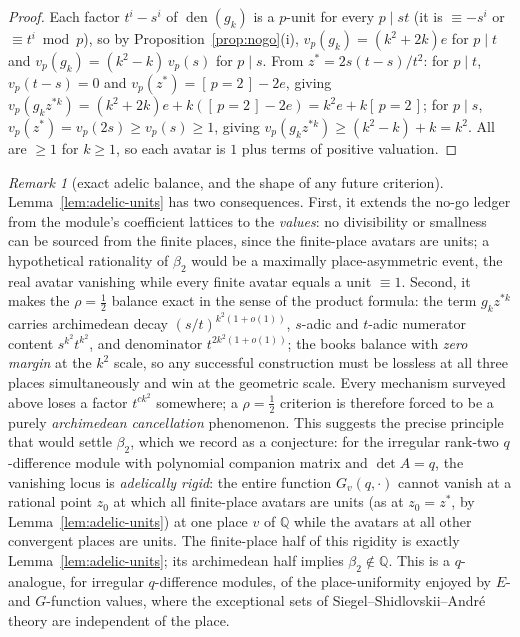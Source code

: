 \documentclass[11pt]{article}
\theoremstyle{plain}
\theoremstyle{definition}
\theoremstyle{remark}
\newtheorem{remark}[theorem]{Remark}
\newcommand{\Q}{\mathbb{Q}}
\begin{document}
\begin{proof}
Each factor $t^i-s^i$ of $\operatorname{den}(g_k)$ is a $p$-unit for every $p\mid st$ (it is
$\equiv-s^i$ or $\equiv t^i\bmod p$), so by Proposition~\ref{prop:nogo}\textup{(i)},
$v_p(g_k)=(k^2+2k)e$ for $p\mid t$ and $v_p(g_k)=(k^2-k)\,v_p(s)$ for $p\mid s$. From
$z^\ast=2s(t-s)/t^2$: for $p\mid t$, $v_p(t-s)=0$ and $v_p(z^\ast)=[\,p=2\,]-2e$, giving
$v_p(g_kz^{\ast k})=(k^2+2k)e+k([\,p=2\,]-2e)=k^2e+k[\,p=2\,]$; for $p\mid s$,
$v_p(z^\ast)=v_p(2s)\ge v_p(s)\ge1$, giving $v_p(g_kz^{\ast k})\ge(k^2-k)+k=k^2$. All are $\ge1$ for
$k\ge1$, so each avatar is $1$ plus terms of positive valuation.
\end{proof}

\begin{remark}[exact adelic balance, and the shape of any future criterion]
\label{rem:adelic-balance}
Lemma~\ref{lem:adelic-units} has two consequences. First, it extends the no-go ledger from the
module's coefficient lattices to the \emph{values}: no divisibility or smallness can be sourced from
the finite places, since the finite-place avatars are units; a hypothetical rationality of
$\beta_2$ would be a maximally place-asymmetric event, the real avatar vanishing while every finite
avatar equals a unit $\equiv1$. Second, it makes the $\rho=\tfrac12$ balance exact in the sense of
the product formula: the term $g_kz^{\ast k}$ carries archimedean decay $(s/t)^{k^2(1+o(1))}$,
$s$-adic and $t$-adic numerator content $s^{k^2}t^{k^2}$, and denominator $t^{2k^2(1+o(1))}$; the
books balance with \emph{zero margin} at the $k^2$ scale, so any successful construction must be
lossless at all three places simultaneously and win at the geometric scale. Every mechanism surveyed
above loses a factor $t^{ck^2}$ somewhere; a $\rho=\tfrac12$ criterion is therefore forced to be a
purely \emph{archimedean cancellation} phenomenon. This suggests the precise principle that would
settle $\beta_2$, which we record as a conjecture: for the irregular rank-two $q$-difference module
with polynomial companion matrix and $\det A=q$, the vanishing locus is \emph{adelically rigid}: the entire function $G_v(q,\cdot)$ cannot vanish at a rational point $z_0$ at which all finite-place
avatars are units (as at $z_0=z^\ast$, by Lemma~\ref{lem:adelic-units}) at one place $v$ of $\Q$
while the avatars at all other convergent places are units. The finite-place half of this rigidity is exactly Lemma~\ref{lem:adelic-units};
its archimedean half implies $\beta_2\notin\Q$. This is a $q$-analogue, for irregular $q$-difference
modules, of the place-uniformity enjoyed by $E$- and $G$-function values, where the exceptional sets
of Siegel--Shidlovskii--Andr\'e theory are independent of the place.
\end{remark}
\end{document}
